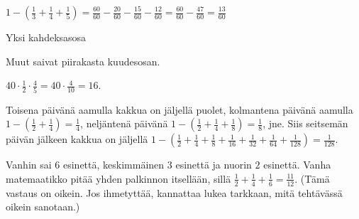 \begin{Vastaus}{57}
            $1-(\frac{1}{3}+\frac{1}{4}+\frac{1}{5})
            = \frac{60}{60}-\frac{20}{60}-\frac{15}{60}-\frac{12}{60}
            = \frac{60}{60}-\frac{47}{60}
            = \frac{13}{60}$
        
\end{Vastaus}
\begin{Vastaus}{58}
			Yksi kahdeksasosa
        
\end{Vastaus}
\begin{Vastaus}{59}
            Muut saivat piirakasta kuudesosan.
        
\end{Vastaus}
\begin{Vastaus}{60}
    
\end{Vastaus}
\begin{Vastaus}{61}
		$40\cdot \frac{1}{2} \cdot \frac{4}{5}=40\cdot \frac{4}{10}= 16$.
	
\end{Vastaus}
\begin{Vastaus}{62}
		Toisena päivänä aamulla kakkua on jäljellä puolet, kolmantena päivänä aamulla
		$1-\left(\frac{1}{2} + \frac{1}{4}\right) = \frac{1}{4}$,
		neljäntenä päivänä
		$1-\left(\frac{1}{2} + \frac{1}{4} + \frac{1}{8}\right)
		= \frac{1}{8}$, jne.
		Siis seitsemän päivän jälkeen kakkua on jäljellä
		$1-\left(\frac{1}{2} + \frac{1}{4} + \frac{1}{8} +
		\frac{1}{16} + \frac{1}{32} + \frac{1}{64} + \frac{1}{128}\right)
		= \frac{1}{128}$.
	
\end{Vastaus}
\begin{Vastaus}{63}
		Vanhin sai $6$ esinettä, keskimmäinen $3$ esinettä ja nuorin $2$ esinettä. Vanha matemaatikko pitää yhden palkinnon itsellään, sillä $\frac{1}{2} + \frac{1}{4} + \frac{1}{6} = \frac{11}{12}$. (Tämä vastaus on oikein. Jos ihmetyttää, kannattaa lukea tarkkaan, mitä tehtävässä oikein sanotaan.)
	
\end{Vastaus}
\begin{Vastaus}{64}
	
\end{Vastaus}
\begin{Vastaus}{65}
	
\end{Vastaus}
